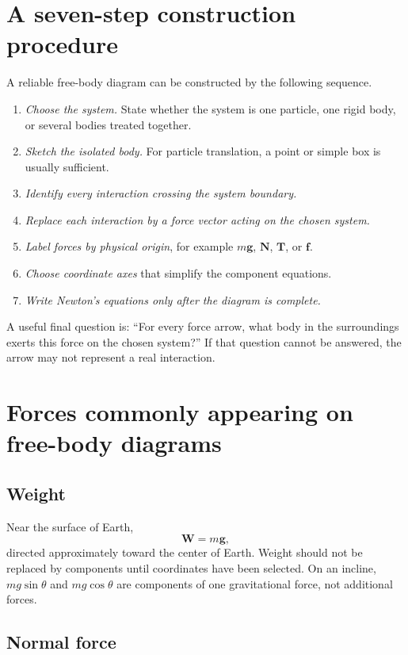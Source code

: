 \section{A seven-step construction procedure}

A reliable free-body diagram can be constructed by the following sequence.
\begin{enumerate}
\item \emph{Choose the system.} State whether the system is one particle, one rigid body, or several bodies treated together.
\item \emph{Sketch the isolated body.} For particle translation, a point or simple box is usually sufficient.
\item \emph{Identify every interaction crossing the system boundary.}
\item \emph{Replace each interaction by a force vector acting on the chosen system.}
\item \emph{Label forces by physical origin}, for example $m\mathbf g$, $\mathbf N$, $\mathbf T$, or $\mathbf f$.
\item \emph{Choose coordinate axes} that simplify the component equations.
\item \emph{Write Newton's equations only after the diagram is complete.}
\end{enumerate}

A useful final question is: ``For every force arrow, what body in the surroundings exerts this
force on the chosen system?''  If that question cannot be answered, the arrow may not represent a
real interaction.

\section{Forces commonly appearing on free-body diagrams}

\subsection*{Weight}

Near the surface of Earth,
\[
\mathbf W=m\mathbf g,
\]
directed approximately toward the center of Earth.  Weight should not be replaced by components
until coordinates have been selected.  On an incline, $mg\sin\theta$ and $mg\cos\theta$ are
components of one gravitational force, not additional forces.

\subsection*{Normal force}

